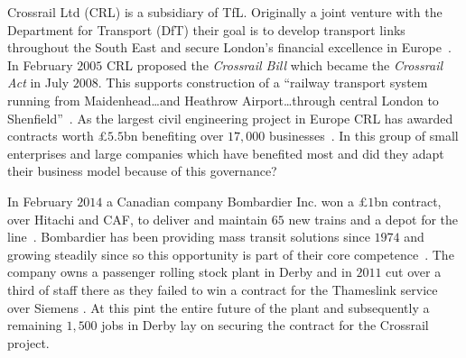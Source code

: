 {}

Crossrail Ltd (CRL) is a subsidiary of TfL.
Originally a joint venture with the Department for Transport (DfT) their goal is to develop transport links throughout the South East and secure London's financial excellence in Europe~\cite{crossrail:about}.
In February $2005$ CRL proposed the \emph{Crossrail Bill} which became the \emph{Crossrail Act} in July $2008$.
This supports construction of a ``railway transport system running from Maidenhead\dots and Heathrow Airport\dots through central London to Shenfield''~\cite{crossrail:act}.
As the largest civil engineering project in Europe CRL has awarded contracts worth \pounds $5.5$bn benefiting over $17,000$ businesses~\cite{crossrail:suppliers}.
In this group of small enterprises and large companies which have benefited most and did they adapt their business model because of this governance?  

In February $2014$ a Canadian company Bombardier Inc. won a \pounds $1$bn contract, over Hitachi and CAF, to deliver and maintain $65$ new trains and a depot for the line~\cite{bbc:bombardier,tfl:bombardier}.  
Bombardier has been providing mass transit solutions since $1974$ and growing steadily since so this opportunity is part of their core competence~\cite{bombardier:about}.
The company owns a passenger rolling stock plant in Derby and in $2011$ cut over a third of staff there as they failed to win a contract for the Thameslink service over Siemens \citeneeded{}.
At this pint the entire future of the plant and subsequently a remaining $1,500$ jobs in Derby lay on securing the contract for the Crossrail project.
